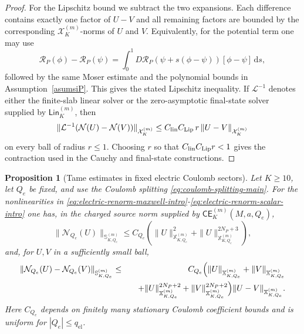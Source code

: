 \documentclass[11pt]{article}
\numberwithin{equation}{section}
\theoremstyle{plain}
\newtheorem{proposition}[theorem]{Proposition}
\theoremstyle{definition}
\theoremstyle{remark}
\newcommand{\dd}{\mathrm{d}}
\newcommand{\Lin}{\mathsf{Lin}}
\newcommand{\CElec}{\mathsf{CE}}
\begin{document}
\begin{proof}
For the Lipschitz bound we subtract the two expansions.  Each difference contains exactly one factor of \(U-V\) and all remaining factors are bounded by the corresponding \(\mathcal X_K^{(m)}\)-norms of \(U\) and \(V\).  Equivalently, for the potential term one may use
\begin{equation}
 \mathcal R_P(\phi)-\mathcal R_P(\psi)
 =\int_0^1 D\mathcal R_P(\psi+s(\phi-\psi))[\phi-\psi]  \,\dd s,
\end{equation}
followed by the same Moser estimate and the polynomial bounds in Assumption~\ref{asumsiP}.  This gives the stated Lipschitz inequality.  If \(\mathcal L^{-1}\) denotes either the finite-slab linear solver or the zero-asymptotic final-state solver supplied by \(\Lin_K^{(m)}\), then
\begin{equation}
 \|\mathcal L^{-1}(\mathcal N(U)-\mathcal N(V))\|_{\mathcal X_K^{(m)}}
 \le C_{\rm lin}C_{\rm Lip}\,r\,\|U-V\|_{\mathcal X_K^{(m)}}
\end{equation}
on every ball of radius \(r\le1\).  Choosing \(r\) so that \(C_{\rm lin}C_{\rm Lip}r<1\) gives the contraction used in the Cauchy and final-state constructions.
\end{proof}



\begin{proposition}[Tame estimates in fixed electric Coulomb sectors]\label{prop:electric-tame-estimates}
Let \(K\ge10\), let \(Q_e\) be fixed, and use the Coulomb splitting \eqref{eq:coulomb-splitting-main}.  For the nonlinearities in \eqref{eq:electric-renorm-maxwell-intro}-\eqref{eq:electric-renorm-scalar-intro} one has, in the charged source norm supplied by \(\CElec^{(m)}_K(M,a,Q_e)\),
\begin{equation}
 \|\mathcal N_{Q_e}(U)\|_{\mathbb S^{(m)}_{K,Q_e}}
 \le C_{Q_e}\left(\|U\|_{\mathbb X^{(m)}_{K,Q_e}}^2+\|U\|_{\mathbb X^{(m)}_{K,Q_e}}^{2N_P+3}\right),
\end{equation}
and, for \(U,V\) in a sufficiently small ball,
\begin{eqnarray}
 \|\mathcal N_{Q_e}(U)-\mathcal N_{Q_e}(V)\|_{\mathbb S^{(m)}_{K,Q_e}}
 &\le& C_{Q_e}\Bigl(\|U\|_{\mathbb X^{(m)}_{K,Q_e}}+\|V\|_{\mathbb X^{(m)}_{K,Q_e}}
 \nonumber\\
 &&\quad+\|U\|_{\mathbb X^{(m)}_{K,Q_e}}^{2N_P+2}+\|V\|_{\mathbb X^{(m)}_{K,Q_e}}^{2N_P+2}\Bigr)
 \|U-V\|_{\mathbb X^{(m)}_{K,Q_e}}.
\end{eqnarray}
Here \(C_{Q_e}\) depends on finitely many stationary Coulomb coefficient bounds and is uniform for \(|Q_e|\le q_{\mathrm{el}}\).
\end{proposition}
\end{document}
